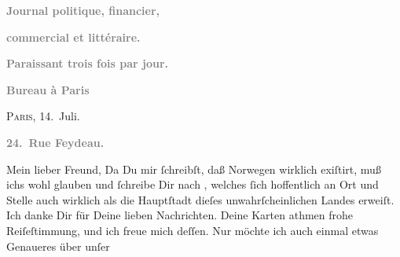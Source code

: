 \begin{ledgroupsized}[t]{13cm}
           \begin{otherlanguage}{french}\textcolor{gray}{\textbf{Journal politique,
                        financier,}}\end{otherlanguage}\pend
           \pstart
           \begin{otherlanguage}{french}\textcolor{gray}{\textbf{commercial et littéraire.}}\end{otherlanguage}\pend
           \pstart
           \begin{otherlanguage}{french}\textcolor{gray}{\textbf{\textbf{Paraissant trois fois par jour.}}}\end{otherlanguage}\pend
           \pstart
           \begin{otherlanguage}{french}\textcolor{gray}{\textbf{\textbf{Bureau à Paris}}}\end{otherlanguage}\hfill \textsc{Paris}, 14. Juli.\pend
           \pstart
           \begin{otherlanguage}{french}\textcolor{gray}{\textbf{\textbf{24. Rue Feydeau.}}}\end{otherlanguage}\pend
           \pstart\center{}Mein lieber Freund,\pend\pstart
           Da Du mir ſchreibſt, daß Norwegen wirklich
               exiſtirt, muß ichs wohl glauben und ſchreibe Dir nach \label{K_L02781-1v}\label{K_L02781-1h}, welches ſich hoffentlich an Ort und Stelle auch
               wirklich als die Hauptſtadt
               dieſes unwahrſcheinlichen Landes erweiſt.\pend
           \pstart
           Ich danke Dir für Deine lieben Nachrichten. Deine Karten athmen frohe Reiſeſtimmung,
               und ich freue mich deſſen.\pend
           \pstart
           {\pb}Nur möchte ich auch einmal etwas Genaueres über
               unſer \label{K_L02781-2v}
\end{ledgroupsized}
